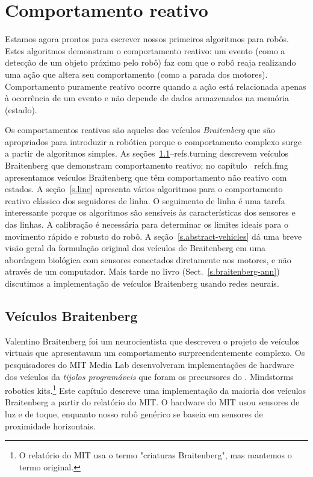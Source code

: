 
\chapter{Comportamento reativo}\label{ch.reactive}

Estamos agora prontos para escrever nossos primeiros algoritmos para robôs. Estes algoritmos demonstram o comportamento reativo: um evento (como a detecção de um objeto próximo pelo robô) faz com que o robô reaja realizando uma ação que altera seu comportamento (como a parada dos motores). Comportamento puramente reativo ocorre quando a ação está relacionada apenas à ocorrência de um evento e não depende de dados armazenados na memória (estado).

Os comportamentos reativos são aqueles dos veículos \emph{Braitenberg} que são apropriados para introduzir a robótica porque o comportamento complexo surge a partir de algoritmos simples. As seções~\ref{s.braitenberg}--ref{s.turning} descrevem veículos Braitenberg que demonstram comportamento reativo; no capítulo ~ref{ch.fmg} apresentamos veículos Braitenberg que têm comportamento não reativo com estados. A seção~\ref{s.line} apresenta vários algoritmos para o comportamento reativo clássico dos seguidores de linha. O seguimento de linha é uma tarefa interessante porque os algoritmos são sensíveis às características dos sensores e das linhas. A calibração é necessária para determinar os limites ideais para o movimento rápido e robusto do robô. A seção~\ref{s.abstract-vehicles} dá uma breve visão geral da formulação original dos veículos de Braitenberg em uma abordagem biológica com sensores conectados diretamente aos motores, e não através de um computador. Mais tarde no livro (Sect.~\ref{s.braitenberg-ann}) discutimos a implementação de veículos Braitenberg usando redes neurais.

\section{Veículos Braitenberg}\label{s.braitenberg}

Valentino Braitenberg foi um neurocientista que descreveu o projeto de veículos virtuais que apresentavam um comportamento surpreendentemente complexo. Os pesquisadores do MIT Media Lab desenvolveram implementações de hardware dos veículos da \emph{tijolos programáveis} que foram os precursores do \lego. Mindstorms robotics kits.\footnote{O relatório do MIT usa o termo "criaturas Braitenberg", mas mantemos o termo original.} Este capítulo descreve uma implementação da maioria dos veículos Braitenberg a partir do relatório do MIT. O hardware do MIT usou sensores de luz e de toque, enquanto nosso robô genérico se baseia em sensores de proximidade horizontais.

